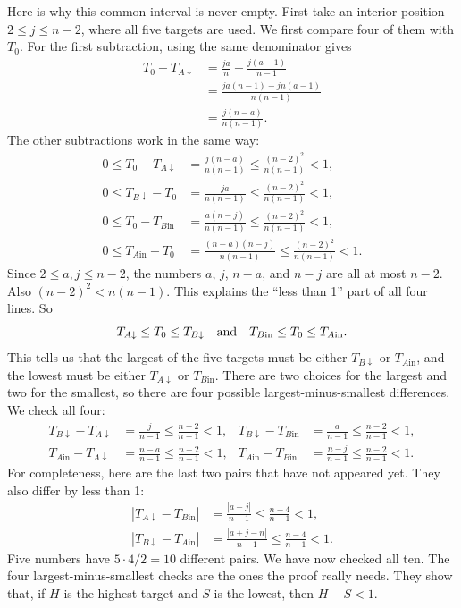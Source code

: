 \documentclass[11pt]{article}
\begin{document}
Here is why this common interval is never empty.  First take an interior
position $2\le j\le n-2$, where all five targets are used.  We first compare
four of them with $T_0$.  For the first subtraction, using the same
denominator gives
\[
\begin{aligned}
 T_0-T_{A\downarrow}
 &=\frac{ja}{n}-\frac{j(a-1)}{n-1}\\
 &=\frac{ja(n-1)-jn(a-1)}{n(n-1)}\\
 &=\frac{j(n-a)}{n(n-1)}.
\end{aligned}
\]
The other subtractions work in the same way:
\begin{align*}
 0\le T_0-T_{A\downarrow}
   &=\frac{j(n-a)}{n(n-1)}
     \le\frac{(n-2)^2}{n(n-1)}<1,\\
 0\le T_{B\downarrow}-T_0
   &=\frac{ja}{n(n-1)}
     \le\frac{(n-2)^2}{n(n-1)}<1,\\
 0\le T_0-T_{B\mathrm{in}}
   &=\frac{a(n-j)}{n(n-1)}
     \le\frac{(n-2)^2}{n(n-1)}<1,\\
 0\le T_{A\mathrm{in}}-T_0
   &=\frac{(n-a)(n-j)}{n(n-1)}
     \le\frac{(n-2)^2}{n(n-1)}<1.
\end{align*}
Since $2\le a,j\le n-2$, the numbers $a$, $j$, $n-a$, and $n-j$ are all at
most $n-2$.  Also $(n-2)^2<n(n-1)$.  This explains the ``less than 1'' part
of all four lines.
So
\[
 T_{A\downarrow}\le T_0\le T_{B\downarrow}
 \quad\hbox{and}\quad
 T_{B\mathrm{in}}\le T_0\le T_{A\mathrm{in}}.
\]
This tells us that the largest of the five targets must be either
$T_{B\downarrow}$ or $T_{A\mathrm{in}}$, and the lowest must be either
$T_{A\downarrow}$ or $T_{B\mathrm{in}}$.  There are two choices for the
largest and two for the smallest, so there are four possible
largest-minus-smallest differences.  We check all four:
\begin{align*}
 T_{B\downarrow}-T_{A\downarrow}
   &=\frac{j}{n-1}
     \le\frac{n-2}{n-1}<1,
 &T_{B\downarrow}-T_{B\mathrm{in}}
   &=\frac{a}{n-1}
     \le\frac{n-2}{n-1}<1,\\
 T_{A\mathrm{in}}-T_{A\downarrow}
   &=\frac{n-a}{n-1}
     \le\frac{n-2}{n-1}<1,
 &T_{A\mathrm{in}}-T_{B\mathrm{in}}
   &=\frac{n-j}{n-1}
     \le\frac{n-2}{n-1}<1.
\end{align*}
For completeness, here are the last two pairs that have not appeared yet.
They also differ by less than 1:
\begin{align*}
 \left|T_{A\downarrow}-T_{B\mathrm{in}}\right|
   &=\frac{|a-j|}{n-1}
     \le\frac{n-4}{n-1}<1,\\
 \left|T_{B\downarrow}-T_{A\mathrm{in}}\right|
   &=\frac{|a+j-n|}{n-1}
     \le\frac{n-4}{n-1}<1.
\end{align*}
Five numbers have $5\cdot4/2=10$ different pairs.  We have now checked all
ten.  The four largest-minus-smallest checks are the ones the proof really
needs.  They show that, if $H$ is the highest target and $S$ is the lowest,
then $H-S<1$.
\end{document}
